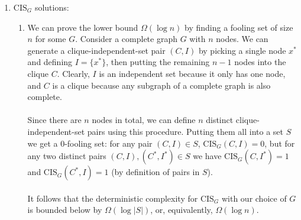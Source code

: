 \documentclass{article}
\begin{document}
\begin{enumerate}
    \item $\textrm{CIS}_G$ solutions:
        \begin{enumerate}[label=(\alph*)]
            \item We can prove the lower bound $\Omega(\log n)$ by finding a
                fooling set of size $n$ for some $G$. Consider a complete graph
                $G$ with $n$ nodes. We can generate a clique-independent-set
                pair $(C, I)$ by picking a single node $x^*$ and defining
                $I = \{ x^* \}$, then putting the remaining $n - 1$ nodes into
                the clique $C$. Clearly, $I$ is an independent set because it
                only has one node, and $C$ is a clique because any subgraph of
                a complete graph is also complete.
                \\\\
                Since there are $n$ nodes in total, we can define $n$ distinct
                clique-independent-set pairs using this procedure. Putting them
                all into a set $S$ we get a 0-fooling set: for any pair $(C, I)
                \in S$, $\textrm{CIS}_G(C, I) = 0$, but for any two distinct
                pairs $(C, I), (C^*, I^*) \in S$ we have $\textrm{CIS}_G(C,
                I^*) = 1$ and $\textrm{CIS}_G(C^*, I) = 1$ (by definition of
                pairs in $S$).
                \\\\
                It follows that the deterministic complexity for
                $\textrm{CIS}_G$ with our choice of $G$ is bounded below by
                $\Omega(\log |S|)$, or, equivalently, $\Omega(\log n)$.
                \\


\end{enumerate}
\end{enumerate}
\end{document}
